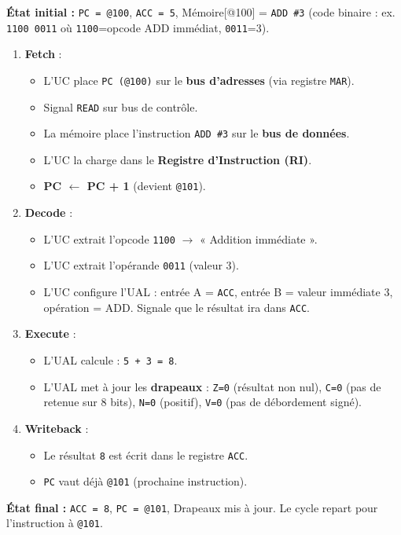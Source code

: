 \documentclass[11pt]{article}
\begin{document}
\begin{exemplebox}[Déroulement pas à pas : \texttt{ADD \#3} (ACC = 5)]
\textbf{État initial :} \texttt{PC = @100}, \texttt{ACC = 5}, Mémoire[@100] = \texttt{ADD \#3} (code binaire : ex. \texttt{1100 0011} où \texttt{1100}=opcode ADD immédiat, \texttt{0011}=3).

\begin{enumerate}
    \item \textbf{Fetch} :
    \begin{itemize}
        \item L'UC place \texttt{PC (@100)} sur le \textbf{bus d'adresses} (via registre \texttt{MAR}).
        \item Signal \texttt{READ} sur bus de contrôle.
        \item La mémoire place l'instruction \texttt{ADD \#3} sur le \textbf{bus de données}.
        \item L'UC la charge dans le \textbf{Registre d'Instruction (RI)}.
        \item \textbf{PC $\leftarrow$ PC + 1} (devient \texttt{@101}).
    \end{itemize}
    \item \textbf{Decode} :
    \begin{itemize}
        \item L'UC extrait l'opcode \texttt{1100} $\to$ « Addition immédiate ».
        \item L'UC extrait l'opérande \texttt{0011} (valeur 3).
        \item L'UC configure l'UAL : entrée A = \texttt{ACC}, entrée B = valeur immédiate 3, opération = ADD. Signale que le résultat ira dans \texttt{ACC}.
    \end{itemize}
    \item \textbf{Execute} :
    \begin{itemize}
        \item L'UAL calcule : \texttt{5 + 3 = 8}.
        \item L'UAL met à jour les \textbf{drapeaux} : \texttt{Z=0} (résultat non nul), \texttt{C=0} (pas de retenue sur 8 bits), \texttt{N=0} (positif), \texttt{V=0} (pas de débordement signé).
    \end{itemize}
    \item \textbf{Writeback} :
    \begin{itemize}
        \item Le résultat \texttt{8} est écrit dans le registre \texttt{ACC}.
        \item \texttt{PC} vaut déjà \texttt{@101} (prochaine instruction).
    \end{itemize}
\end{enumerate}
\textbf{État final :} \texttt{ACC = 8}, \texttt{PC = @101}, Drapeaux mis à jour. Le cycle repart pour l'instruction à \texttt{@101}.
\end{exemplebox}
\end{document}
